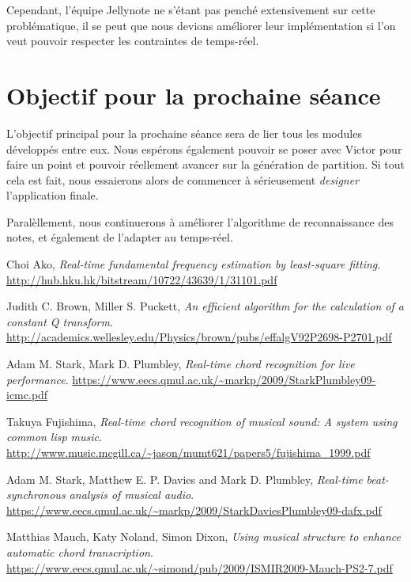 \documentclass[12pt]{article}
\begin{document}
\par Cependant, l'équipe Jellynote ne s'étant pas penché extensivement sur cette problématique, il se peut que nous devions améliorer leur implémentation si l'on veut pouvoir respecter les contraintes de temps-réel.

\section{Objectif pour la prochaine séance}

\par L'objectif principal pour la prochaine séance sera de lier tous les modules développés entre eux. Nous espérons également pouvoir se poser avec Victor pour faire un point et pouvoir réellement avancer sur la génération de partition. Si tout cela est fait, nous essaierons alors de commencer à sérieusement \emph{designer} l'application finale.
\par Paralèllement, nous continuerons à améliorer l'algorithme de reconnaissance des notes, et également de l'adapter au temps-réel.
\newpage

\begin{thebibliography}{9}

  Choi Ako,
  \emph{Real-time fundamental frequency estimation by least-square fitting}.
  \url{http://hub.hku.hk/bitstream/10722/43639/1/31101.pdf}


  Judith C. Brown, Miller S. Puckett,
  \emph{An efficient algorithm for the calculation of a constant Q transform}.
  \url{http://academics.wellesley.edu/Physics/brown/pubs/effalgV92P2698-P2701.pdf}


  Adam M. Stark, Mark D. Plumbley,
  \emph{Real-time chord recognition for live performance}.
  \url{https://www.eecs.qmul.ac.uk/~markp/2009/StarkPlumbley09-icmc.pdf}


  Takuya Fujishima,
  \emph{Real-time chord recognition of musical sound: A system using common lisp music}.
  \url{http://www.music.mcgill.ca/~jason/mumt621/papers5/fujishima_1999.pdf}


  Adam M. Stark, Matthew E. P. Davies and Mark D. Plumbley,
  \emph{Real-time beat-synchronous analysis of musical audio}.
  \url{https://www.eecs.qmul.ac.uk/~markp/2009/StarkDaviesPlumbley09-dafx.pdf}


  Matthias Mauch, Katy Noland, Simon Dixon,
  \emph{Using musical structure to enhance automatic chord transcription}.
  \url{https://www.eecs.qmul.ac.uk/~simond/pub/2009/ISMIR2009-Mauch-PS2-7.pdf}

\end{thebibliography}
\end{document}
